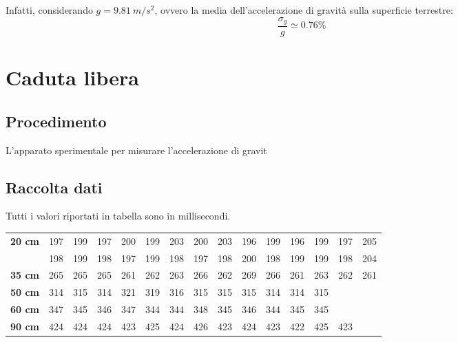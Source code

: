 Infatti, considerando $g=9.81\ m/s^2$, ovvero la media dell'accelerazione di gravità sulla superficie terrestre:
$$\frac{\sigma_g}{g} \simeq 0.76\% $$


\section{Caduta libera}
\subsection{Procedimento}
L'apparato sperimentale per misurare l'accelerazione di gravit
\subsection{Raccolta dati}
Tutti i valori riportati in tabella sono in millisecondi.
\begin{center}
\begin{tabular}{r|*{14}{c}}
\textbf{20 cm} & 197 & 199 & 197 & 200 & 199 & 203 & 200 & 203 & 196 & 199 & 196 & 199 & 197 & 205\\
& 198 & 199 & 198 & 197 & 199 & 198 & 197 & 198 & 200 & 198 & 199 & 199 & 198 & 204\\
\midrule
\textbf{35 cm} & 265 & 265 & 265 & 261 & 262 & 263 & 266 & 262 & 269 & 266 & 261 & 263 & 262 & 261\\
\midrule
\textbf{50 cm} & 314 & 315 & 314 & 321 & 319 & 316 & 315 & 315 & 315 & 314 & 314 & 315\\
\midrule
\textbf{60 cm} & 347 & 345 & 346 & 347 & 344 & 344 & 348 & 345 & 346 & 344 & 345 & 345\\
\midrule
\textbf{90 cm} & 424& 424& 424& 423& 425& 424& 426& 423& 424& 423& 422& 425& 423\\
\end{tabular}
\end{center}

